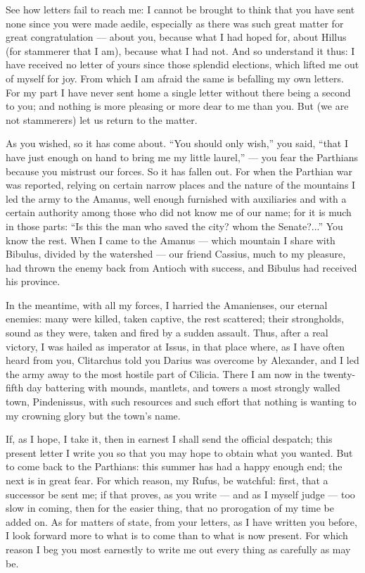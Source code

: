 

 See how letters fail to reach me: I cannot be brought to think that you have sent none since you were made aedile, especially as there was such great matter for great congratulation --- about you, because what I had hoped for, about Hillus (for stammerer that I am), because what I had not. And so understand it thus: I have received no letter of yours since those splendid elections, which lifted me out of myself for joy. From which I am afraid the same is befalling my own letters. For my part I have never sent home a single letter without there being a second to you; and nothing is more pleasing or more dear to me than you. But (we are not stammerers) let us return to the matter.

 As you wished, so it has come about. ``You should only wish,'' you said, ``that I have just enough on hand to bring me my little laurel,'' --- you fear the Parthians because you mistrust our forces. So it has fallen out. For when the Parthian war was reported, relying on certain narrow places and the nature of the mountains I led the army to the Amanus, well enough furnished with auxiliaries and with a certain authority among those who did not know me of our name; for it is much in those parts: ``Is this the man who saved the city? whom the Senate?...'' You know the rest. When I came to the Amanus --- which mountain I share with Bibulus, divided by the watershed --- our friend Cassius, much to my pleasure, had thrown the enemy back from Antioch with success, and Bibulus had received his province.

 In the meantime, with all my forces, I harried the Amanienses, our eternal enemies: many were killed, taken captive, the rest scattered; their strongholds, sound as they were, taken and fired by a sudden assault. Thus, after a real victory, I was hailed as imperator at Issus, in that place where, as I have often heard from you, Clitarchus told you Darius was overcome by Alexander, and I led the army away to the most hostile part of Cilicia. There I am now in the twenty-fifth day battering with mounds, mantlets, and towers a most strongly walled town, Pindenissus, with such resources and such effort that nothing is wanting to my crowning glory but the town's name.

 If, as I hope, I take it, then in earnest I shall send the official despatch; this present letter I write you so that you may hope to obtain what you wanted. But to come back to the Parthians: this summer has had a happy enough end; the next is in great fear. For which reason, my Rufus, be watchful: first, that a successor be sent me; if that proves, as you write --- and as I myself judge --- too slow in coming, then for the easier thing, that no prorogation of my time be added on. As for matters of state, from your letters, as I have written you before, I look forward more to what is to come than to what is now present. For which reason I beg you most earnestly to write me out every thing as carefully as may be.
